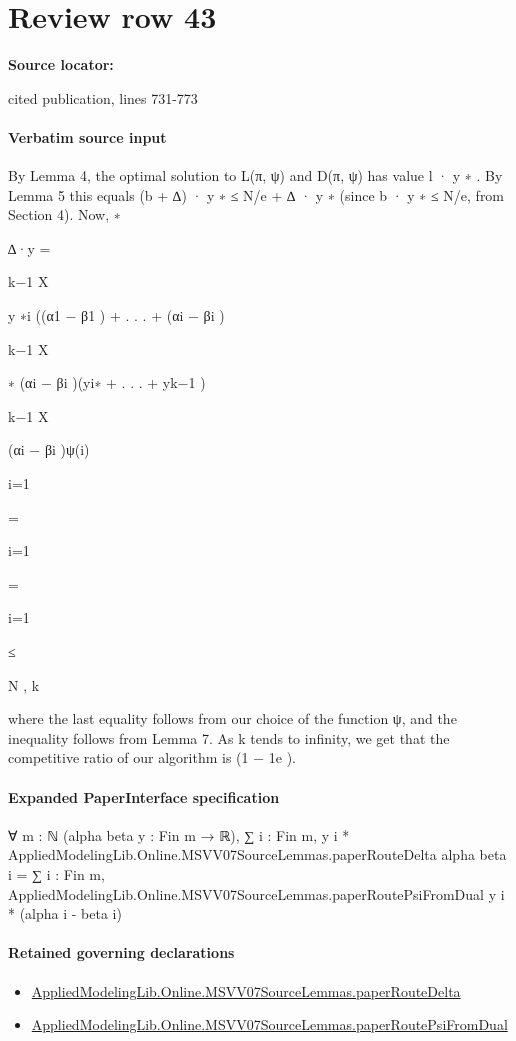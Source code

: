 \documentclass[10pt]{article}
\begin{document}
\section*{Review row 43}
\textbf{Source locator:} {\footnotesize\raggedright cited publication, lines 731-\allowbreak{}773\par}
\paragraph{Verbatim source input}
\begin{ReviewVerbatim}
By Lemma 4, the optimal solution to L(π, ψ) and D(π, ψ) has value l · y ∗ . By
Lemma 5 this equals (b + ∆) · y ∗ ≤ N/e + ∆ · y ∗ (since b · y ∗ ≤ N/e, from Section 4).
Now,
∗

∆·y =

k−1
X

y ∗i ((α1 − β1 ) + . . . + (αi − βi )

k−1
X

∗
(αi − βi )(yi∗ + . . . + yk−1
)

k−1
X

(αi − βi )ψ(i)

i=1

=

i=1

=

i=1

≤

N
,
k

where the last equality follows from our choice of the function ψ, and the inequality follows
from Lemma 7. As k tends to infinity, we get that the competitive ratio of our algorithm is
(1 − 1e ).
\end{ReviewVerbatim}



\paragraph{Expanded PaperInterface specification}
\begin{ReviewVerbatim}
∀ {m : ℕ} (alpha beta y : Fin m → ℝ),
  ∑ i : Fin m, y i * AppliedModelingLib.Online.MSVV07SourceLemmas.paperRouteDelta alpha beta i =
    ∑ i : Fin m, AppliedModelingLib.Online.MSVV07SourceLemmas.paperRoutePsiFromDual y i * (alpha i - beta i)
\end{ReviewVerbatim}

\paragraph{Retained governing declarations}
\begin{itemize}\raggedright
\item \hyperlink{governing-declaration-b9e7309f4b3f7cfa}{Applied\allowbreak{}Modeling\allowbreak{}Lib.\allowbreak{}Online.\allowbreak{}MSVV07\allowbreak{}Source\allowbreak{}Lemmas.\allowbreak{}paper\allowbreak{}Route\allowbreak{}Delta}
\item \hyperlink{governing-declaration-03b53d20f26d0a02}{Applied\allowbreak{}Modeling\allowbreak{}Lib.\allowbreak{}Online.\allowbreak{}MSVV07\allowbreak{}Source\allowbreak{}Lemmas.\allowbreak{}paper\allowbreak{}Route\allowbreak{}Psi\allowbreak{}From\allowbreak{}Dual}
\end{itemize}
\end{document}
